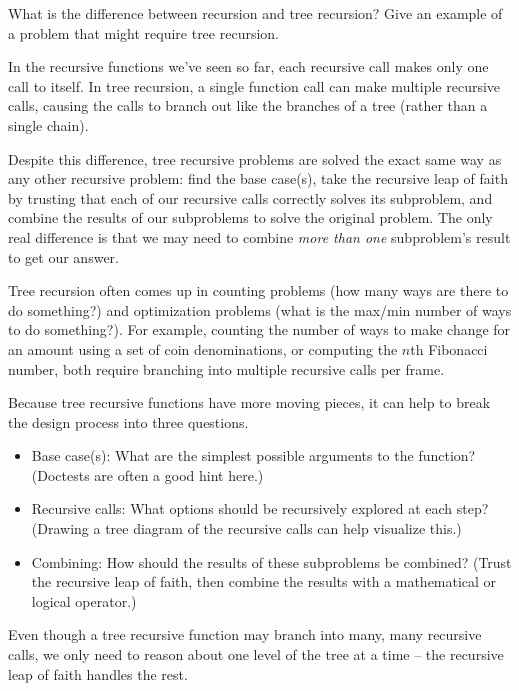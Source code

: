\begin{blocksection}
\question What is the difference between recursion and tree recursion? Give an example of a problem that might require tree recursion.

\begin{solution}[1in]
In the recursive functions we've seen so far, each recursive call makes only one call to itself. In tree recursion, a single function call can make multiple recursive calls, causing the calls to branch out like the branches of a tree (rather than a single chain).

Despite this difference, tree recursive problems are solved the exact same way as any other recursive problem: find the base case(s), take the recursive leap of faith by trusting that each of our recursive calls correctly solves its subproblem, and combine the results of our subproblems to solve the original problem. The only real difference is that we may need to combine \textit{more than one} subproblem's result to get our answer.

Tree recursion often comes up in counting problems (how many ways are there to do something?) and optimization problems (what is the max/min number of ways to do something?). For example, counting the number of ways to make change for an amount using a set of coin denominations, or computing the $n$th Fibonacci number, both require branching into multiple recursive calls per frame.

Because tree recursive functions have more moving pieces, it can help to break the design process into three questions.
\begin{itemize}
  \item Base case(s): What are the simplest possible arguments to the function? (Doctests are often a good hint here.)
  \item Recursive calls: What options should be recursively explored at each step? (Drawing a tree diagram of the recursive calls can help visualize this.)
  \item Combining: How should the results of these subproblems be combined? (Trust the recursive leap of faith, then combine the results with a mathematical or logical operator.)
\end{itemize}

Even though a tree recursive function may branch into many, many recursive calls, we only need to reason about one level of the tree at a time -- the recursive leap of faith handles the rest.
\end{solution}
\end{blocksection}
